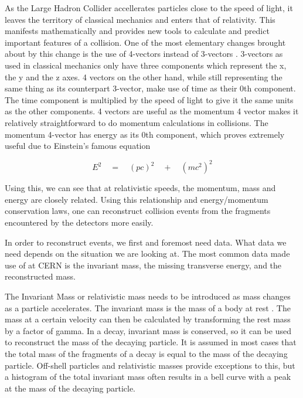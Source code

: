 \documentclass[runningheads,a4paper]{llncs}
\begin{document}


As the Large Hadron Collider accellerates particles close to the speed of light, it leaves the territory of classical mechanics and enters that of relativity. This manifests mathematically and provides new tools to calculate and predict important features of a collision. One of the most elementary changes brought about by this change is the use of 4-vectors instead of 3-vectors \cite{griffithsintroduction}. 3-vectors as used in classical mechanics only have three components which represent the x, the y and the z axes. 4 vectors on the other hand, while still representing the same thing as its counterpart 3-vector, make use of time as their 0th component. The time component is multiplied by the speed of light to give it the same units as the other components. 
4 vectors are useful as the momentum 4 vector makes it relatively straightforward to do momentum calculations in collisions. The momentum 4-vector has energy as its 0th component, which proves extremely useful due to Einstein’s famous equation 

\begin{equation}
{ E }^{ 2 }\quad ={ \quad (pc) }^{ 2 }\quad +\quad { (m{ c }^{ 2 }) }^{ 2 }
\end{equation}

Using this, we can see that at relativistic speeds, the momentum, mass and energy are closely related. Using this relationship and energy/momentum conservation laws, one can reconstruct collision events from the fragments encountered by the detectors more easily.

In order to reconstruct events, we first and foremost need data. What data we need depends on the situation we are looking at. The most common data made use of at CERN is the invariant mass, the missing transverse energy, and the reconstructed mass. 

The Invariant Mass or relativistic mass needs to be introduced as mass changes as a particle accelerates. The invariant mass is the mass of a body at rest \cite{helliwell2010special}. The mass at a certain velocity can then be calculated by transforming the rest mass by a factor of gamma. In a decay, invariant mass is conserved, so it can be used to reconstruct the mass of the decaying particle. It is assumed in most cases that the total mass of the fragments of a decay is equal to the mass of the decaying particle. Off-shell particles and relativistic masses provide exceptions to this, but a histogram of the total invariant mass often results in a bell curve with a peak at the mass of the decaying particle. 
\end{document}
